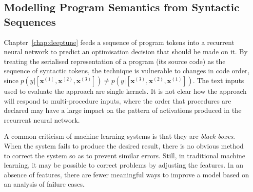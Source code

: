 



\subsection{Modelling Program Semantics from Syntactic Sequences}

Chapter~\ref{chap:deeptune} feeds a sequence of program tokens into a recurrent neural network to predict an optimisation decision that should be made on it. By treating the serialised representation of a program (its source code) as the sequence of syntactic tokens, the technique is vulnerable to changes in code order, since $p(y|[\bm{x}^{(1)}, \bm{x}^{(2)}, \bm{x}^{(3)}]) \ne p(y|[\bm{x}^{(3)}, \bm{x}^{(2)}, \bm{x}^{(1)}])$. The text inputs used to evaluate the approach are single kernels. It is not clear how the approach will respond to multi-procedure inputs, where the order that procedures are declared may have a large impact on the pattern of activations produced in the recurrent neural network.




A common criticism of machine learning systems is that they are \emph{black boxes}. When the system fails to produce the desired result, there is no obvious method to correct the system so as to prevent similar errors. Still, in traditional machine learning, it may be possible to correct problems by adjusting the features. In an absence of features, there are fewer meaningful ways to improve a model based on an analysis of failure cases.


